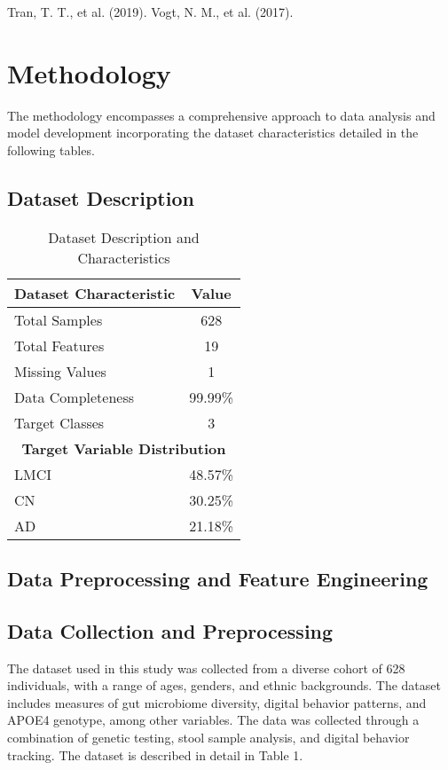 \documentclass[conference]{IEEEtran}
\begin{document}
Tran, T. T., et al. (2019). Vogt, N. M., et al. (2017).

\section{Methodology}
The methodology encompasses a comprehensive approach to data analysis and model development incorporating the dataset characteristics detailed in the following tables.

\subsection{Dataset Description}

\begin{table}[!h]
\centering
\caption{Dataset Description and Characteristics}
\label{tab:dataset_description}
\begin{tabular}{|l|c|}
\hline
\textbf{Dataset Characteristic} & \textbf{Value} \\
\hline
Total Samples & 628 \\
\hline
Total Features & 19 \\
\hline
Missing Values & 1 \\
\hline
Data Completeness & 99.99\% \\
\hline
Target Classes & 3 \\
\hline
\hline
\multicolumn{2}{|c|}{\textbf{Target Variable Distribution}} \\
\hline
LMCI & 48.57\% \\
\hline
CN & 30.25\% \\
\hline
AD & 21.18\% \\
\hline
\end{tabular}
\end{table}



\subsection{Data Preprocessing and Feature Engineering}
\subsection{Data Collection and Preprocessing}

The dataset used in this study was collected from a diverse cohort of 628 individuals, with a range of ages, genders, and ethnic backgrounds. The dataset includes measures of gut microbiome diversity, digital behavior patterns, and APOE4 genotype, among other variables. The data was collected through a combination of genetic testing, stool sample analysis, and digital behavior tracking. The dataset is described in detail in Table 1.
\end{document}
